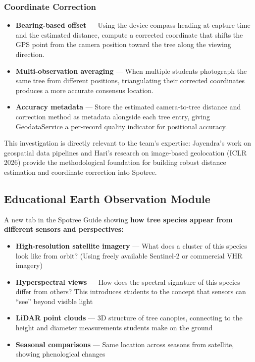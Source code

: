 \documentclass[11pt,a4paper]{article}
\begin{document}
\subsubsection{Coordinate Correction}
\begin{itemize}
  \item \textbf{Bearing-based offset} --- Using the device compass heading at capture time and the estimated distance, compute a corrected coordinate that shifts the GPS point from the camera position toward the tree along the viewing direction.
  \item \textbf{Multi-observation averaging} --- When multiple students photograph the same tree from different positions, triangulating their corrected coordinates produces a more accurate consensus location.
  \item \textbf{Accuracy metadata} --- Store the estimated camera-to-tree distance and correction method as metadata alongside each tree entry, giving GeodataService a per-record quality indicator for positional accuracy.
\end{itemize}

This investigation is directly relevant to the team's expertise: Jayendra's work on geospatial data pipelines and Hari's research on image-based geolocation (ICLR 2026) provide the methodological foundation for building robust distance estimation and coordinate correction into Spotree.

\subsection{Educational Earth Observation Module}

A new tab in the Spotree Guide showing \textbf{how tree species appear from different sensors and perspectives:}

\begin{itemize}
  \item \textbf{High-resolution satellite imagery} --- What does a cluster of this species look like from orbit? (Using freely available Sentinel-2 or commercial VHR imagery)
  \item \textbf{Hyperspectral views} --- How does the spectral signature of this species differ from others? This introduces students to the concept that sensors can ``see'' beyond visible light
  \item \textbf{LiDAR point clouds} --- 3D structure of tree canopies, connecting to the height and diameter measurements students make on the ground
  \item \textbf{Seasonal comparisons} --- Same location across seasons from satellite, showing phenological changes
\end{itemize}
\end{document}
